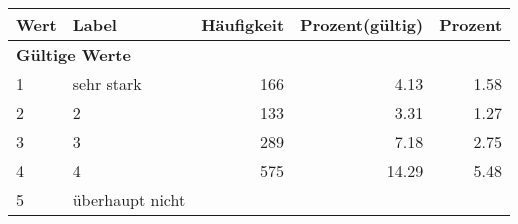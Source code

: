      \begin{longtable}{lXrrr}
     \toprule
     \textbf{Wert} & \textbf{Label} & \textbf{Häufigkeit} & \textbf{Prozent(gültig)} & \textbf{Prozent} \\
     \endhead
     \midrule
     \multicolumn{5}{l}{\textbf{Gültige Werte}}\\

     1 &
     \multicolumn{1}{X}{ sehr stark   } &


       \num{166} &
       \num[round-mode=places,round-precision=2]{4.13} &
         \num[round-mode=places,round-precision=2]{1.58} \\

     2 &
     \multicolumn{1}{X}{ 2   } &


       \num{133} &
       \num[round-mode=places,round-precision=2]{3.31} &
         \num[round-mode=places,round-precision=2]{1.27} \\

     3 &
     \multicolumn{1}{X}{ 3   } &


       \num{289} &
       \num[round-mode=places,round-precision=2]{7.18} &
         \num[round-mode=places,round-precision=2]{2.75} \\

     4 &
     \multicolumn{1}{X}{ 4   } &


       \num{575} &
       \num[round-mode=places,round-precision=2]{14.29} &
         \num[round-mode=places,round-precision=2]{5.48} \\

     5 &
     \multicolumn{1}{X}{ überhaupt nicht   } &



\end{longtable}
